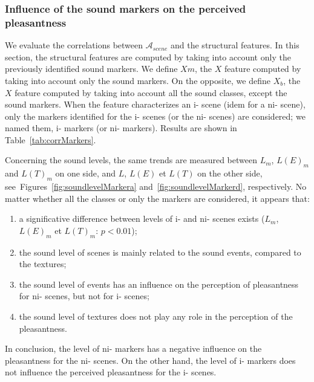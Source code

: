 \documentclass[twoside,twocolumn]{article}
\begin{document}
\subsubsection*{Influence of the sound markers on the perceived pleasantness}

We evaluate the correlations between $\mathcal{A}_{scene}$ and the structural features. In this section, the structural features are computed by taking into account only the previously identified sound markers. We define $Xm$, the $X$ feature computed by taking into account only the sound markers. On the opposite, we define $X_b$, the $X$ feature computed by taking into account all the sound classes, except the sound markers. When the feature characterizes an i- scene (idem for a ni- scene),  only the markers identified for the i- scenes (or the ni- scenes) are considered; we named them, i- markers (or ni- markers). Results are shown in Table~\ref{tab:corrMarkers}.

Concerning the sound levels, the same trends are measured between $L_m$, $L(E)_m$ and $L(T)_m$ on one side, and $L$, $L(E)$ et $L(T)$ on the other side, see~Figures~\ref{fig:soundlevelMarkera} and~\ref{fig:soundlevelMarkerd}, respectively. No matter whether all the classes or only the markers are considered, it appears that:

\begin{enumerate}
\item a significative difference between levels of i- and ni- scenes exists ($L_m$, $L(E)_m$ et $L(T)_m$: $p<0.01$);
\item the sound level of scenes is mainly related to the sound events, compared to the textures;
\item the sound level of events has an influence on the perception of pleasantness for ni- scenes, but not for i- scenes;
\item the sound level of textures does not play any role in the perception of the pleasantness.
\end{enumerate}

In conclusion, the level of ni- markers has a negative influence on the pleasantness for the ni- scenes. On the other hand, the level of i- markers does not influence the perceived pleasantness for the i- scenes.

\end{document}
